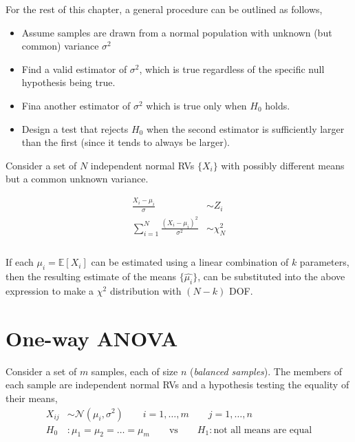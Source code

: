 For the rest of this chapter, a general procedure can be outlined as follows,\\

\begin{itemize}
	\item Assume samples are drawn from a normal population with unknown (but common) variance $ \sigma^2 $
	\item Find a valid estimator of $ \sigma^2 $, which is true regardless of the specific null hypothesis being true.
	\item Fina another estimator of $ \sigma^2 $ which is true only when $ H_0 $ holds.
	\item Design a test that rejects $ H_0 $ when the second estimator is sufficiently larger than the first (since it tends to always be larger). 
\end{itemize}


Consider a set of $ N $ independent normal RVs $ \{X_i\} $ with possibly different means but a common unknown variance. 

\begin{align}
	\frac{X_i - \mu_i}{\sigma} &\sim Z_i \nonumber \\
	\sum\limits_{i = 1}^{N} \frac{(X_i - \mu_i)^2}{\sigma^2} &\sim \chi^2_{N} \nonumber \\
\end{align}\\

If each $ \mu_i  = \mathbb{E}[X_i]$ can be estimated using a linear combination of $ k $ parameters, then the resulting estimate of the means $ \{\widehat{\mu_i}\} $, can be substituted into the above expression to make a $ \chi^2 $ distribution with $ (N-k) $ DOF.\\

\section{One-way ANOVA}

Consider a set of $ m $ samples, each of size $ n $ (\textit{balanced samples}). The members of each sample are independent normal RVs and a hypothesis testing the equality of their means, \\

\begin{align}
	X_{ij} &\sim \mathcal{N}(\mu_i, \sigma^2) \qquad i = 1,\dots,m \qquad j = 1,\dots,n \\
	H_0 &: \mu_1 = \mu_2 = \dots = \mu_m \qquad \text{vs} \qquad H_1 : \text{not all means are equal}
\end{align}\\

